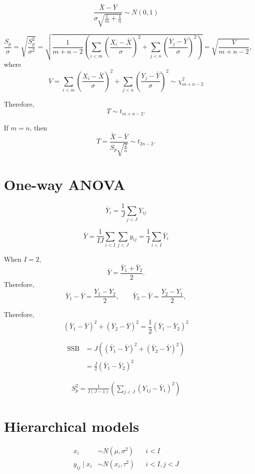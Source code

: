 \documentclass{amsart}
\begin{document}
$$
\frac{\bar{X} - \bar{Y}}{\sigma\sqrt{\frac1m + \frac1n}}\sim N(0, 1)
$$

$$
\frac{S_p}{\sigma} = \sqrt{\frac{S_p^2}{\sigma^2}}
= \sqrt{\frac1{m + n - 2}\left(\sum_{i < m}\left(\frac{X_i - \bar{X}}{\sigma}\right)^2 + \sum_{j < n}\left(\frac{Y_j - \bar{Y}}{\sigma}\right)^2\right)}
= \sqrt{\frac{V}{m + n - 2}},
$$
where
$$
V = \sum_{i < m}\left(\frac{X_i - \bar{X}}{\sigma}\right)^2 + \sum_{j < n}\left(\frac{Y_j - \bar{Y}}{\sigma}\right)^2
\sim\chi^2_{m + n - 2}
$$

Therefore,
$$
T\sim t_{m + n - 2}.
$$

If $m=n$, then
$$
T = \frac{\bar{X} - \bar{Y}}{S_p\sqrt{\frac2n}}\sim t_{2n-2}.
$$

\section{One-way ANOVA}
\[
\bar{Y}_i = \frac1J\sum_{j < J}Y_{ij}
\]

\[
\bar{Y} = \frac1{IJ}\sum_{i < I}\sum_{j < J}y_{ij}
= \frac1I\sum_{i < I}\bar{Y}_i
\]

When $I=2$,
\[
\bar{Y} = \frac{\bar{Y}_1 + \bar{Y}_2}{2}.
\]
Therefore,
\[
    \bar{Y}_1 - \bar{Y} = \frac{Y_1 - Y_2}{2},\qquad
    \bar{Y}_2 - \bar{Y} = \frac{Y_2 - Y_1}{2},
\]

Therefore,
\[
    (\bar{Y}_1 - \bar{Y})^2 + (\bar{Y}_2 - \bar{Y})^2
    = \frac12\left(\bar{Y}_1 - \bar{Y}_2\right)^2
\]

\begin{align*}
    \operatorname{SSB} 
    &= J\left((\bar{Y}_1 - \bar{Y})^2 + (\bar{Y}_2 - \bar{Y})^2\right)\\
    &=\frac{J}{2}\left(\bar{Y}_1 - \bar{Y}_2\right)^2
\end{align*}

\begin{align*}
    S_p^2
    = \frac1{I(J-1)}\left(\sum_{j < J}(Y_{1j} - \bar{Y}_1)^2\right)
\end{align*}

\section{Hierarchical models}

\begin{align*}
x_i&\sim N(\mu, \sigma^2)&& i < I\\
y_{ij}\mid x_i&\sim N(x_i,\tau^2)&&i < I, j < J
\end{align*}
\end{document}
